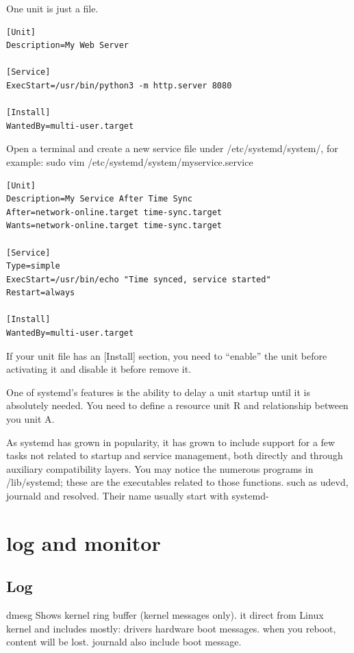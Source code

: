\documentclass[paper=8.5in:11in, twoside, 12pt, pagesize=pdftex]{book}
\begin{document}
	\par One unit is just a file.
\begin{lstlisting}
[Unit]
Description=My Web Server

[Service]
ExecStart=/usr/bin/python3 -m http.server 8080

[Install]
WantedBy=multi-user.target
\end{lstlisting}

	\par Open a terminal and create a new service file under /etc/systemd/system/, for example:  sudo vim /etc/systemd/system/myservice.service
\begin{lstlisting}
[Unit]
Description=My Service After Time Sync
After=network-online.target time-sync.target
Wants=network-online.target time-sync.target

[Service]
Type=simple
ExecStart=/usr/bin/echo "Time synced, service started"
Restart=always

[Install]
WantedBy=multi-user.target
\end{lstlisting}

	\par If your unit file has an [Install] section, you need to “enable” the unit before activating it and disable it before remove it. 

	\par One of systemd’s features is the ability to delay a unit startup until it is absolutely needed. You need to define a resource unit R and relationship between you unit A.

	\par As systemd has grown in popularity, it has grown to include support for a few tasks not related to startup and service management, both directly and through auxiliary compatibility layers. You may notice the numerous programs in /lib/systemd; these are the executables related to those functions. such as udevd, journald and resolved. Their name usually start with systemd-

		
\section{log and monitor}

\subsection{Log}

	\par dmesg Shows kernel ring buffer (kernel messages only). it direct from Linux kernel and includes mostly: drivers hardware boot messages. when you reboot, content will be lost. journald also include boot message.
\end{document}
